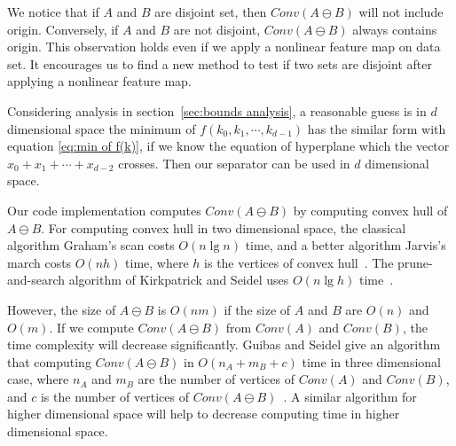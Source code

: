 \documentclass{article}
\begin{document}
We notice that if $A$ and $B$ are disjoint set, then $Conv(A\ominus B)$ will not include origin. Conversely, if $A$ and $B$ are not disjoint, $Conv(A\ominus B)$ 
always contains origin.
This observation holds even if we apply a nonlinear feature map on data set. It encourages us to find a new method to test if two sets are disjoint after 
applying
a nonlinear feature map.\par

Considering analysis in section~\ref{sec:bounds analysis}, a reasonable guess is in $d$ dimensional space the minimum of $f(k_0,k_1,\cdots,k_{d-1})$ has the similar
form with equation \eqref{eq:min of f(k)}, if we know the equation of hyperplane which the vector $x_0+x_1+\cdots+x_{d-2}$ crosses. Then our separator can 
be used in
$d$ dimensional space.\par

Our code implementation computes $Conv(A\ominus B)$ by computing convex hull of $A\ominus B$. For computing convex hull in two dimensional space, the
classical algorithm Graham's scan costs $O(n\lg{n})$ time, and a better algorithm Jarvis's
march costs $O(nh)$ time, where $h$ is the vertices of convex hull~\cite{cormen2009introduction}. The prune-and-search algorithm of Kirkpatrick and Seidel
uses $O(n\lg{h})$ time~\cite{Kirkpatrick:1986:UPC:13535.13555}. \par
However, the size of $A\ominus B$ is $O(nm)$ if the size of $A$ and
$B$ are $O(n)$ and $O(m)$. If we compute $Conv(A\ominus B)$ from $Conv(A)$ and $Conv(B)$, the time complexity will decrease significantly.
Guibas and Seidel give an algorithm that computing $Conv(A\ominus B)$ in $O(n_A+m_B+c)$ time in three dimensional case, where $n_A$ and $m_B$ are the number of 
vertices of
$Conv(A)$ and $Conv(B)$, and $c$ is the number of vertices of $Conv(A\ominus B)$~\cite{Guibas:1986:CCR:10515.10525}. A similar algorithm for higher 
dimensional space will help
to decrease computing time in higher dimensional space.\par



\end{document}
